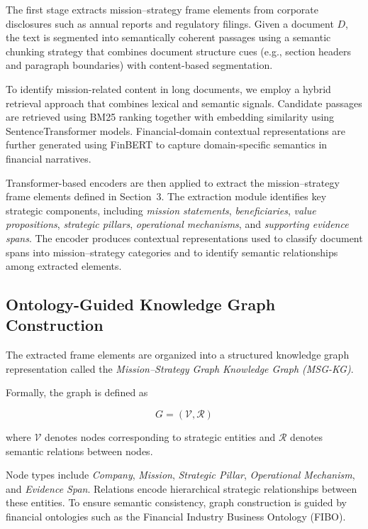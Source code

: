 \documentclass[11pt]{article}
\begin{document}
The first stage extracts mission--strategy frame elements from corporate disclosures such as annual reports and regulatory filings. Given a document $D$, the text is segmented into semantically coherent passages using a semantic chunking strategy that combines document structure cues (e.g., section headers and paragraph boundaries) with content-based segmentation.

To identify mission-related content in long documents, we employ a hybrid retrieval approach that combines lexical and semantic signals. Candidate passages are retrieved using BM25 ranking together with embedding similarity using SentenceTransformer models. Financial-domain contextual representations are further generated using FinBERT to capture domain-specific semantics in financial narratives.

Transformer-based encoders are then applied to extract the mission--strategy frame elements defined in Section~3. The extraction module identifies key strategic components, including \textit{mission statements}, \textit{beneficiaries}, \textit{value propositions}, \textit{strategic pillars}, \textit{operational mechanisms}, and \textit{supporting evidence spans}. The encoder produces contextual representations used to classify document spans into mission--strategy categories and to identify semantic relationships among extracted elements.

\subsection{Ontology-Guided Knowledge Graph Construction}

The extracted frame elements are organized into a structured knowledge graph representation called the \textit{Mission--Strategy Graph Knowledge Graph (MSG-KG)}.

Formally, the graph is defined as

\begin{equation}
G = (\mathcal{V}, \mathcal{R})
\end{equation}

where $\mathcal{V}$ denotes nodes corresponding to strategic entities and $\mathcal{R}$ denotes semantic relations between nodes.

Node types include \textit{Company}, \textit{Mission}, \textit{Strategic Pillar},
\textit{Operational Mechanism}, and \textit{Evidence Span}.
Relations encode hierarchical strategic relationships between these entities. To ensure semantic consistency, graph construction is guided by financial ontologies such as the Financial Industry Business Ontology (FIBO).
\end{document}
